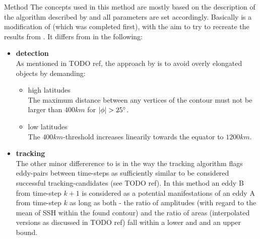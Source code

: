 

\newpage

\begin{cbox}{Method \MI}\label{box:MI}
The concepts used in this method are mostly based on the description of the algorithm described by \citet{Chelton2011} and all parameters are set accordingly. Basically \MI is a modification of \MII (which was completed first), with the aim to try to recreate the results from \citep{Chelton2011}.
It differs from \MII in the following:
\begin{itemize}
	\item \textbf{detection}\\
As mentioned in TODO ref, the approach by \citet{Chelton2011} is to avoid overly elongated objects by demanding:
\begin{itemize}
	\item high latitudes\\
	The maximum distance between any vertices of the contour must not be larger than $400km$ for $\abs{\phi}>\deg{25}$.
	\item low latitudes\\
The $400km$-threshold increases linearily towards the equator to $1200km$.
\end{itemize}
	\item \textbf{tracking}\\
The other minor differerence to \MII is in the way the tracking algorithm flags eddy-pairs between time-steps as sufficiently similar to be considered successful tracking-candidates (see TODO ref).
In this method an eddy B from time-step $k+1$ is considered as a potential manifestations of an eddy A from time-step $k$ as long as both - the ratio of amplitudes (with regard to the mean of SSH within the found contour) and the ratio of areas (interpolated versions as discussed in TODO ref) fall within a lower and and an upper bound.
\end{itemize}
\end{cbox}


